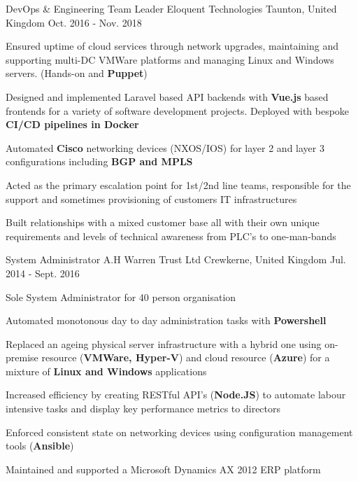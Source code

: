 \begin{cventries}
  \cventry
    {DevOps \& Engineering Team Leader} %
    {Eloquent Technologies} %
    {Taunton, United Kingdom} %
    {Oct. 2016 - Nov. 2018} %
    {
      \begin{cvitems} %
        \item {Ensured uptime of cloud services through network upgrades, maintaining and supporting multi-DC VMWare platforms and managing Linux and Windows servers. (Hands-on and \textbf{Puppet})}
        \item {Designed and implemented Laravel based API backends with \textbf{Vue.js} based frontends for a variety of software development projects. Deployed with bespoke \textbf{CI/CD pipelines in Docker}}
        \item {Automated \textbf{Cisco} networking devices (NXOS/IOS) for layer 2 and layer 3 configurations including \textbf{BGP and MPLS}}
        \item {Acted as the primary escalation point for 1st/2nd line teams, responsible for the support and sometimes provisioning of customers IT infrastructures}
        \item {Built relationships with a mixed customer base all with their own unique requirements and levels of technical awareness from PLC's to one-man-bands  }
      \end{cvitems}
    }

  \cventry
    {System Administrator} %
    {A.H Warren Trust Ltd} %
    {Crewkerne, United Kingdom} %
    {Jul. 2014 - Sept. 2016} %
    {
      \begin{cvitems} %
        \item {Sole System Administrator for 40 person organisation}
        \item {Automated monotonous day to day administration tasks with \textbf{Powershell}}
        \item {Replaced an ageing physical server infrastructure with a hybrid one using on-premise resource (\textbf{VMWare, Hyper-V}) and cloud resource (\textbf{Azure}) for a mixture of \textbf{Linux and Windows} applications}
        \item {Increased efficiency by creating RESTful API's (\textbf{Node.JS}) to automate labour intensive tasks and display key performance metrics to directors}
        \item {Enforced consistent state on networking devices using configuration management tools (\textbf{Ansible})}
        \item {Maintained and supported a Microsoft Dynamics AX 2012 ERP platform}
      \end{cvitems}
    }


\end{cventries}
